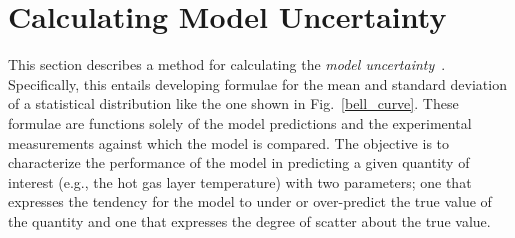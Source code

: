 \section{Calculating Model Uncertainty}

This section describes a method for calculating the {\em model uncertainty}~\cite{McGrattan:Metrologia}. Specifically, this entails developing formulae for
the mean and standard deviation of a statistical distribution like the one shown in Fig.~\ref{bell_curve}. These formulae are functions
solely of the model predictions and the experimental measurements against which the model is compared. The objective is to
characterize the performance of the model in predicting a given quantity of interest (e.g., the hot gas layer temperature) with two
parameters; one that expresses the tendency for the model to under or over-predict the true value of the quantity and one that expresses the degree of scatter
about the true value.

